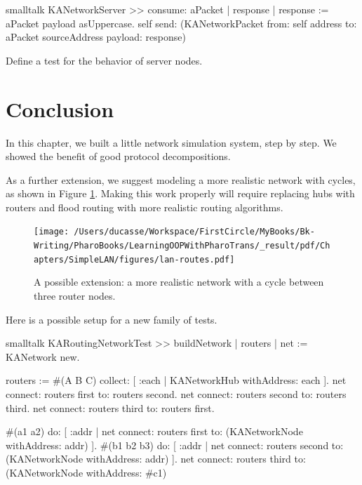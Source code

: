 \documentclass[10pt,twoside,english]{_support/latex/sbabook/sbabook}
\begin{document}
\begin{displaycode}{smalltalk}
KANetworkServer >> consume: aPacket
    | response |
    response := aPacket payload asUppercase.
    self send: (KANetworkPacket
        from: self address
        to: aPacket sourceAddress
        payload: response)
\end{displaycode}

Define a test for the behavior of server nodes.
\section{Conclusion}
In this chapter, we built a little network simulation system, step by step.
We showed the benefit of good protocol decompositions.

As a further extension, we suggest modeling a more realistic network with cycles, as shown in Figure \ref{routing}.
Making this work properly will require replacing hubs with routers and flood routing with more realistic routing algorithms.


\begin{figure}

\begin{center}
\texttt{[image: /Users/ducasse/Workspace/FirstCircle/MyBooks/Bk-Writing/PharoBooks/LearningOOPWithPharoTrans/\_result/pdf/Chapters/SimpleLAN/figures/lan-routes.pdf]}\caption{A possible extension: a more realistic network with a cycle between three router nodes. \label{routing}}\end{center}
\end{figure}


Here is a possible setup for a new family of tests. 

\begin{displaycode}{smalltalk}
KARoutingNetworkTest >> buildNetwork
    | routers |
    net := KANetwork new.

    routers := #(A B C) collect:
        [ :each | KANetworkHub withAddress: each ].
    net connect: routers first to: routers second.
    net connect: routers second to: routers third.
    net connect: routers third to: routers first.

    #(a1 a2) do: [ :addr |
        net connect: routers first
            to: (KANetworkNode withAddress: addr) ].
    #(b1 b2 b3) do: [ :addr |
        net connect: routers second
            to: (KANetworkNode withAddress: addr) ].
    net connect: routers third
        to: (KANetworkNode withAddress: #c1)
\end{displaycode}


\backmatter



\end{document}
